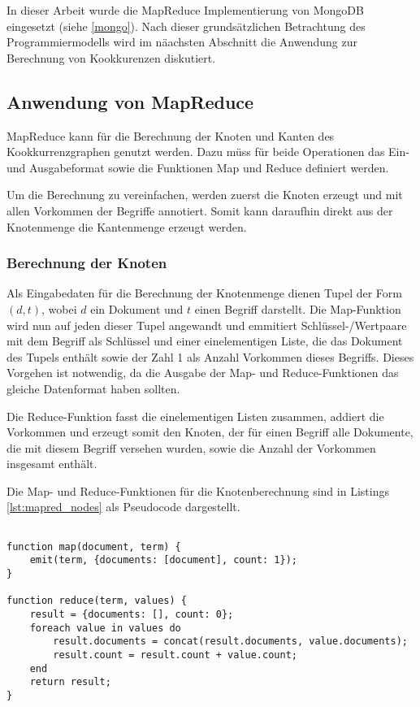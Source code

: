 In dieser Arbeit wurde die MapReduce Implementierung von MongoDB eingesetzt (siehe \ref{mongo}). Nach dieser grundsätzlichen Betrachtung des Programmiermodells wird im näachsten Abschnitt die Anwendung zur Berechnung von Kookkurenzen diskutiert.

\subsection{Anwendung von MapReduce}
\label{mapreduce_cooccurence}

MapReduce kann für die Berechnung der Knoten und Kanten des Kookkurrenzgraphen genutzt werden. Dazu müss für beide Operationen das Ein- und Ausgabeformat sowie die Funktionen Map und Reduce definiert werden.

Um die Berechnung zu vereinfachen, werden zuerst die Knoten erzeugt und mit allen Vorkommen der Begriffe annotiert. Somit kann daraufhin direkt aus der Knotenmenge die Kantenmenge erzeugt werden.

\subsubsection{Berechnung der Knoten}

Als Eingabedaten für die Berechnung der Knotenmenge dienen Tupel der Form \((d, t)\), wobei \(d\) ein Dokument und \(t\) einen Begriff darstellt. Die Map-Funktion wird nun auf jeden dieser Tupel angewandt und emmitiert Schlüssel-/Wertpaare mit dem Begriff als Schlüssel und einer einelementigen Liste, die das Dokument des Tupels enthält sowie der Zahl \num{1} als Anzahl Vorkommen dieses Begriffs. Dieses Vorgehen ist notwendig, da die Ausgabe der Map- und Reduce-Funktionen das gleiche Datenformat haben sollten.

Die Reduce-Funktion fasst die einelementigen Listen zusammen, addiert die Vorkommen und erzeugt somit den Knoten, der für einen Begriff alle Dokumente, die mit diesem Begriff versehen wurden, sowie die Anzahl der Vorkommen insgesamt enthält.

Die Map- und Reduce-Funktionen für die Knotenberechnung sind in Listings \ref{lst:mapred_nodes} als Pseudocode dargestellt.

\begin{lstlisting}[language=pseudo, label={lst:mapred_nodes}, caption={Knotenerzeugung mit MapReduce}]

function map(document, term) {
    emit(term, {documents: [document], count: 1});
}

function reduce(term, values) {
    result = {documents: [], count: 0};
    foreach value in values do
        result.documents = concat(result.documents, value.documents);
        result.count = result.count + value.count;
    end
    return result;
}
\end{lstlisting}

